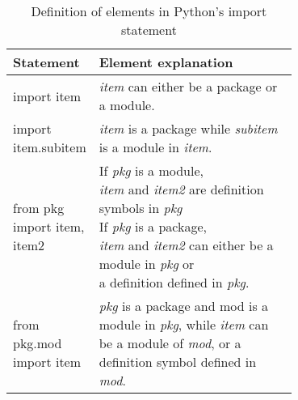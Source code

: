 \begin{table}[ht]
    \centering
    \begin{tabular}{ |l|p{0.7\linewidth}| }
        \hline
        Statement                   & Element explanation                                                                                                                                                 \\
        \hline
        import item                 & \textit{item} can either be a package or a module.                                                                                                                  \\
        \hline
        import item.subitem         & \textit{item} is a package while \textit{subitem} is a module in \textit{item}.                                                                                     \\
        \hline
        from pkg import item, item2 &
        \makecell[l]
        {If \textit{pkg} is a module,                                                                                                                                                                     \\ \textit{item} and \textit{item2} are definition symbols in \textit{pkg}                                                            \\
            If \textit{pkg} is a package,                                                                                                                                                                 \\ \textit{item} and \textit{item2} can either be a module in \textit{pkg} or \\ a definition defined in \textit{pkg}.
        }                                                                                                                                                                                                 \\
        \hline
        from pkg.mod import item    & \textit{pkg} is a package and mod is a module in \textit{pkg}, while \textit{item} can be a module of \textit{mod}, or a definition symbol defined in \textit{mod}. \\
        \hline
    \end{tabular}
    \caption{Definition of elements in Python's import statement }
    \label{table:python-import-def}
\end{table}

